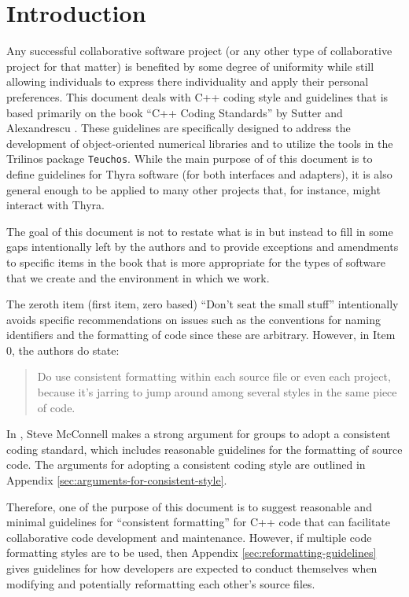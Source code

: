 %
\section{Introduction}
%

Any successful collaborative software project (or any other type of
collaborative project for that matter) is benefited by some degree of
uniformity while still allowing individuals to express there individuality and
apply their personal preferences.  This document deals with C++ coding style
and guidelines that is based primarily on the book ``C++ Coding Standards'' by
Sutter and Alexandrescu {}\cite{C++CodingStandards05}.  These guidelines are
specifically designed to address the development of object-oriented numerical
libraries and to utilize the tools in the Trilinos package {}\texttt{Teuchos}.
While the main purpose of of this document is to define guidelines for Thyra
software (for both interfaces and adapters), it is also general enough to be
applied to many other projects that, for instance, might interact with Thyra.

The goal of this document is not to restate what is in
{}\cite{C++CodingStandards05} but instead to fill in some gaps intentionally
left by the authors and to provide exceptions and amendments to specific items
in the book that is more appropriate for the types of software that we create
and the environment in which we work.

The zeroth item (first item, zero based) ``Don't seat the small stuff''
intentionally avoids specific recommendations on issues such as the
conventions for naming identifiers and the formatting of code since these are
arbitrary.  However, in Item 0, the authors do state:

\begin{quote}

Do use consistent formatting within each source file or even each project,
because it's jarring to jump around among several styles in the same piece of
code.

\end{quote}

In {}\cite{CodeComplete2nd04}, Steve McConnell makes a strong argument for
groups to adopt a consistent coding standard, which includes reasonable
guidelines for the formatting of source code.  The arguments for adopting a
consistent coding style are outlined in Appendix
{}\ref{sec:arguments-for-consistent-style}.

Therefore, one of the purpose of this document is to suggest reasonable and
minimal guidelines for ``consistent formatting'' for C++ code that can
facilitate collaborative code development and maintenance.  However, if
multiple code formatting styles are to be used, then Appendix
{}\ref{sec:reformatting-guidelines} gives guidelines for how developers are
expected to conduct themselves when modifying and potentially reformatting
each other's source files.

